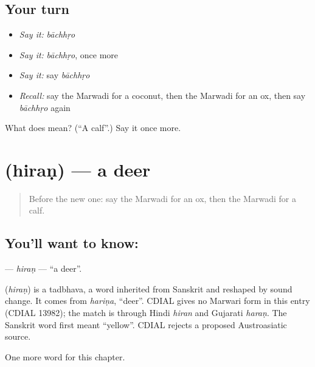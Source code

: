 \subsection*{Your turn}
\begin{itemize}
\raggedright
  \item \emph{Say it:} \emph{bāchhṛo}
  \item \emph{Say it:} \emph{bāchhṛo}, once more
  \item \emph{Say it:} say \emph{bāchhṛo}
  \item \emph{Recall:} say the Marwadi for a coconut, then the Marwadi for an ox, then say \emph{bāchhṛo} again
\end{itemize}

\begin{tcolorbox}[breakable,colback=teal!4,colframe=teal!35!black,title={Before you move on}]
What does  mean? (\textquotedblleft{}A calf\textquotedblright{}.) Say it once more.
\end{tcolorbox}
\section[\texorpdfstring{\mw{हिरण} (hiraṇ)}{हिरण (hiraṇ)}]{ (hiraṇ) — a deer}

\label{lesson:MW-C138-hiran}



\begin{quote}
Before the new one: say the Marwadi for an ox, then the Marwadi for a calf.
\end{quote}

\subsection*{You'll want to know: }
\textbf{} — \emph{hiraṇ} — \textquotedblleft{}a deer\textquotedblright{}.

\begin{cousinweb}
\textbf{} (\emph{hiraṇ}) is a tadbhava, a word inherited from Sanskrit and reshaped by sound change. It comes from \emph{hariṇa}, \textquotedblleft{}deer\textquotedblright{}. CDIAL gives no Marwari form in this entry (CDIAL 13982); the match is through Hindi \emph{hiran} and Gujarati \emph{haraṇ}. The Sanskrit word first meant \textquotedblleft{}yellow\textquotedblright{}. CDIAL rejects a proposed Austroasiatic source.
\end{cousinweb}

\begin{grammarlens}[title={What you've built}]
One more word for this chapter.
\end{grammarlens}

